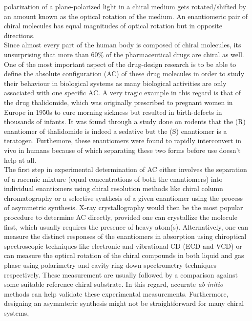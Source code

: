 polarization of a plane-polarized light in a chiral medium gets rotated/shifted by an amount known as 
the optical rotation of the medium. An enantiomeric pair of chiral molecules has equal magnitudes of 
optical rotation but in opposite directions.\\
Since almost every part of the human body is composed of chiral molecules, its unsurprising that
more than 60\% of the pharmaceutical drugs are chiral as well. One of the most 
important aspect of the drug-design research is to be able to define the absolute configuration 
(AC) of these drug molecules in order to study their behaviour in biological systems as 
many biological activities are only associated with one specific AC. A very tragic example
in this regard is that of the drug thalidomide, which was originally prescribed to pregnant women in 
Europe in 1950s to cure morning sickness but resulted in birth-defects in thousands of 
infants. It was found through a study done on rodents that the (R) enantiomer of thalidomide is indeed 
a sedative but the (S) enantiomer is a teratogen\cite{Crawford06}. Furthemore, these enantiomers were 
found to rapidly interconvert in vivo in humans because of which separating 
these two forms before use doesn't help at all.
\\
The first step in experimental determination of AC either involves the separation of 
a racemic mixture (equal concentrations of both the enantiomers) into individual enantiomers
using chiral resolution methods like chiral column chromatography or a selective synthesis
of a given enantiomer using the process of asymmetric synthesis. X-ray crystallography would then be the 
most popular procedure to determine AC directly, provided one can crystallize the molecule first, which usually 
requires the presence of heavy atom(s). Alternatively, one can measure the distinct responses of 
the enantiomers in absorption using chiroptical spectroscopic techniques like electronic and vibrational 
CD (ECD and VCD) or can measure the optical rotation of the chiral compounds in both liquid 
and gas phase using polarimetry and cavity ring down spectrometry techniques\cite{} respectively.
These measurement are usually followed by a comparison against some suitable reference chiral
substrate. In this regard, accurate {\em ab initio} methods can help validate these experimental measurements.
Furthermore, designing an asymmteric synthesis might not be straightforward for many chiral systems, 

